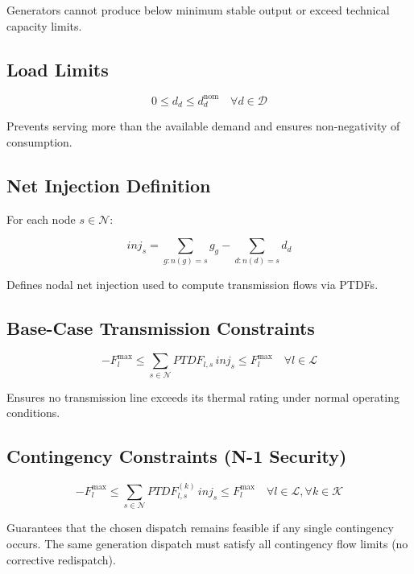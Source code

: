 \documentclass[11pt]{article}
\begin{document}
 
Generators cannot produce below minimum stable output or exceed technical capacity limits.

\subsection{Load Limits}

\begin{equation}
0 \le d_d \le d_d^{\text{nom}}
\quad \forall d \in \mathcal{D}
\end{equation}

 
Prevents serving more than the available demand and ensures non-negativity of consumption.

\subsection{Net Injection Definition}

For each node $s \in \mathcal{N}$:

\begin{equation}
inj_s =
\sum_{g: n(g)=s} g_g
-
\sum_{d: n(d)=s} d_d
\end{equation}

 
Defines nodal net injection used to compute transmission flows via PTDFs.

\subsection{Base-Case Transmission Constraints}

\begin{equation}
- F_l^{\max}
\le
\sum_{s \in \mathcal{N}} PTDF_{l,s} \, inj_s
\le
F_l^{\max}
\quad \forall l \in \mathcal{L}
\end{equation}

 
Ensures no transmission line exceeds its thermal rating under normal operating conditions.

\subsection{ Contingency Constraints (N-1 Security)}

\begin{equation}
- F_l^{\max}
\le
\sum_{s \in \mathcal{N}} PTDF_{l,s}^{(k)} \, inj_s
\le
F_l^{\max}
\quad \forall l \in \mathcal{L}, \forall k \in \mathcal{K}
\end{equation}

 
Guarantees that the chosen dispatch remains feasible if any single contingency occurs.  
The same generation dispatch must satisfy all contingency flow limits (no corrective redispatch).
\end{document}

